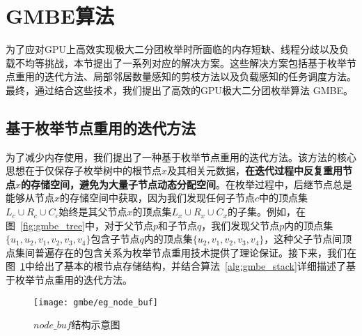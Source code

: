 

\section{GMBE算法}
为了应对GPU上高效实现极大二分团枚举时所面临的内存短缺、线程分歧以及负载不均等挑战，本节提出了一系列对应的解决方案。这些解决方案包括基于枚举节点重用的迭代方法、局部邻居数量感知的剪枝方法以及负载感知的任务调度方法。最终，通过结合这些技术，我们提出了高效的GPU极大二分团枚举算法 GMBE。


\subsection{基于枚举节点重用的迭代方法}
\label{subsec:gmbe_memory}


为了减少内存使用，我们提出了一种基于枚举节点重用的迭代方法。该方法的核心思想在于仅保存子枚举树中的根节点$x$及其相关元数据，\textbf{在迭代过程中反复重用节点$x$的存储空间，避免为大量子节点动态分配空间}。在枚举过程中，后继节点总是能够从节点$x$的存储空间中获取，因为我们发现任何子节点$c$中的顶点集$L_c \cup R_c \cup C_c$始终是其父节点$x$的顶点集$L_x\cup R_x\cup C_x$的子集。例如，在图~\ref{fig:gmbe_tree}中，对于父节点$p$和子节点$q$，我们发现父节点$p$内的顶点集$\{u_1, u_2, v_1, v_2, v_3, v_4\}$包含子节点$q$内的顶点集$\{u_2, v_1, v_2, v_3, v_4\}$，这种父子节点间顶点集间普遍存在的包含关系为枚举节点重用技术提供了理论保证。接下来，我们在图~\ref{fig:gmbe_node_buf}中给出了基本的根节点存储结构，并结合算法~\ref{alg:gmbe_stack}详细描述了基于枚举节点重用的迭代方法。




\begin{figure} [H]
  \center
    \texttt{[image: gmbe/eg\_node\_buf]}
  \caption{$node\_buf$结构示意图}
  \label{fig:gmbe_node_buf}
\end{figure}



